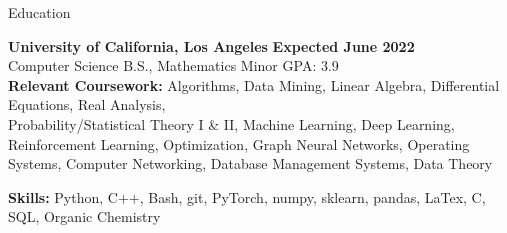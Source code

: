 \documentclass{resume}
\begin{document}
\begin{rSection}{Education}

{\bf University of California, Los Angeles} \hfill {\bf Expected June 2022} 
\\ Computer Science B.S., Mathematics Minor \hfill {GPA: 3.9}\\
{\bf Relevant Coursework:} Algorithms, Data Mining, Linear Algebra, Differential Equations, Real Analysis,\\ Probability/Statistical Theory I \& II, 
Machine Learning, Deep Learning, Reinforcement Learning, Optimization, Graph Neural Networks, Operating Systems, Computer Networking, Database Management Systems,
Data Theory
\end{rSection}

{\bf Skills:} Python, C++, Bash, git, PyTorch, numpy, sklearn, pandas, LaTex, C, SQL, Organic Chemistry
\end{document}
